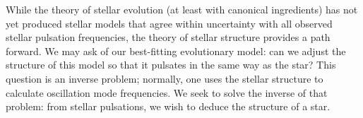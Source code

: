 \documentclass[twocolumn,twocolappendix]{aastex6}
\begin{document}
While the theory of stellar evolution (at least with canonical ingredients) has not yet produced stellar models that agree within uncertainty with all observed stellar pulsation frequencies, the theory of stellar structure provides a path forward. We may ask of our best-fitting evolutionary model: can we adjust the structure of this model so that it pulsates in the same way as the star? 
This question is an inverse problem; normally, one uses the stellar structure to calculate oscillation mode frequencies.  %
We seek to solve the inverse of that problem: from stellar pulsations, we wish to deduce the structure of a star. 
\end{document}
